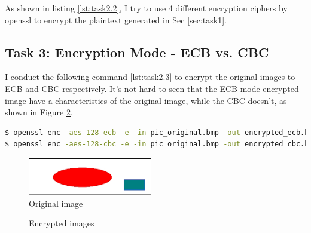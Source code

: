 \documentclass[a4paper]{article}
\begin{document}
As shown in listing \ref{lst:task2.2}, I try to use 4 different encryption ciphers by openssl to encrypt the plaintext generated in Sec \ref{sec:task1}.

\subsection{Task 3: Encryption Mode - ECB vs. CBC}
I conduct the following command \ref{lst:task2.3} to encrypt the original images to ECB and CBC respectively. It's not hard to seen that the ECB mode encrypted image have a characteristics of the original image, while the CBC doesn't, as shown in Figure \ref{fig:task3encrypted}.
\begin{lstlisting}[caption={TASK\ 2.3\ Command\ Lines},label={lst:task2.3},language=BASH,breaklines=true]
$ openssl enc -aes-128-ecb -e -in pic_original.bmp -out encrypted_ecb.bmp -K 00112233445566778889aabbccddeeff # ECB Mode
$ openssl enc -aes-128-cbc -e -in pic_original.bmp -out encrypted_cbc.bmp -K 00112233445566778889aabbccddeeff  -iv 0102030405060708 # CBC Mode
\end{lstlisting}

\begin{figure}[h]
    \centering
       \includegraphics[width=0.48\textwidth]{figures/task3/originalimage.png}
    \caption{Original image}\label{fig:task3original}
\end{figure}

\begin{figure}[h]
    \centering
    \hfill
    \hfill
    \caption{Encrypted images}\label{fig:task3encrypted}
\end{figure}
\end{document}
